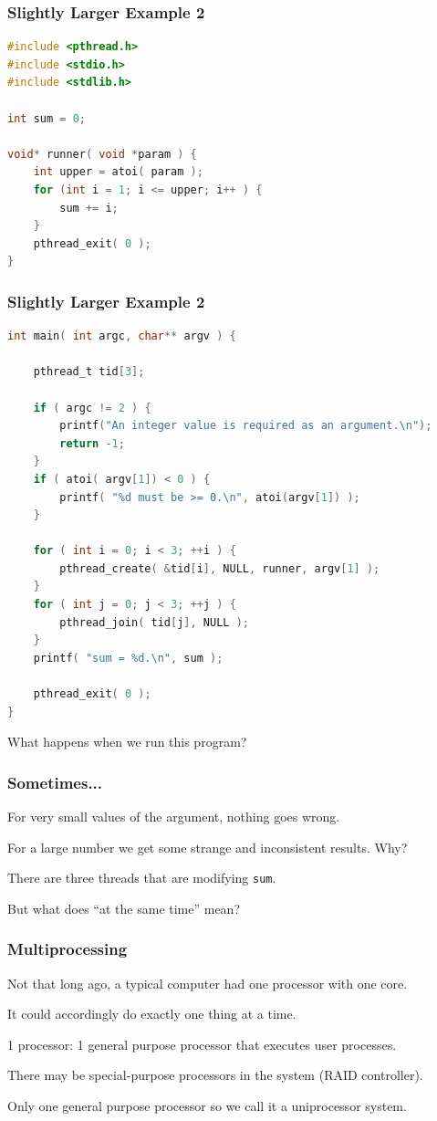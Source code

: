 \begin{frame}[fragile]
	\frametitle{Slightly Larger Example 2}

	\begin{lstlisting}[language=C]
#include <pthread.h>
#include <stdio.h>
#include <stdlib.h>

int sum = 0;

void* runner( void *param ) {
    int upper = atoi( param );
    for (int i = 1; i <= upper; i++ ) {
        sum += i;
    }
    pthread_exit( 0 );
}
\end{lstlisting}


\end{frame}

\begin{frame}[fragile]
	\frametitle{Slightly Larger Example 2}


	\begin{lstlisting}[language=C]
int main( int argc, char** argv ) {

    pthread_t tid[3];

    if ( argc != 2 ) {
        printf("An integer value is required as an argument.\n");
        return -1;
    }
    if ( atoi( argv[1]) < 0 ) {
        printf( "%d must be >= 0.\n", atoi(argv[1]) );
    }

    for ( int i = 0; i < 3; ++i ) {
        pthread_create( &tid[i], NULL, runner, argv[1] );
    }
    for ( int j = 0; j < 3; ++j ) {
        pthread_join( tid[j], NULL );
    }
    printf( "sum = %d.\n", sum );

    pthread_exit( 0 );
}
\end{lstlisting}

	What happens when we run this program?

\end{frame}


\begin{frame}
	\frametitle{Sometimes...}

	For very small values of the argument, nothing goes wrong.

	For a large number we get some strange and inconsistent results. Why?

	There are three threads that are modifying \texttt{sum}.

	But what does ``at the same time'' mean?

\end{frame}

\begin{frame}
	\frametitle{Multiprocessing}

	Not that long ago, a typical computer had one processor with one core.

	It could accordingly do exactly one thing at a time.

	1 processor: 1 general purpose processor that executes user processes.

	There may be special-purpose processors in the system (RAID controller).

	Only one general purpose processor so we call it a uniprocessor system.



\end{frame}


